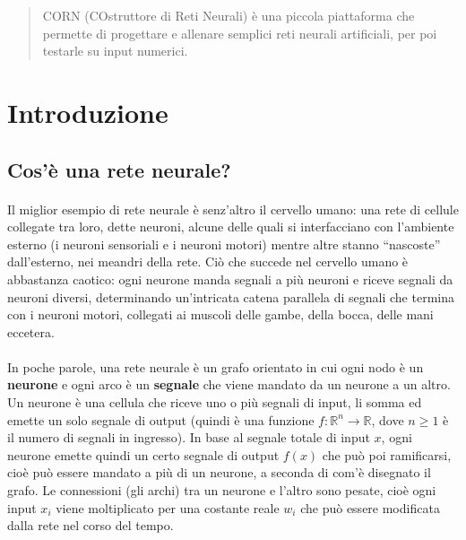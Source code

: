 \documentclass[12pt]{article}
\begin{document}
\maketitle




\begin{abstract}
\textsc{CORN} (COstruttore di Reti Neurali) è una piccola piattaforma che permette di progettare e allenare semplici reti neurali artificiali, per poi  testarle su input numerici.
\end{abstract}




\section{Introduzione}

\subsection{Cos'è una rete neurale?}

\paragraph{}
Il miglior esempio di rete neurale è senz'altro il cervello umano: una rete di cellule collegate tra loro, dette neuroni, alcune delle quali si interfacciano con l'ambiente esterno (i neuroni sensoriali e i neuroni motori) mentre altre stanno “nascoste” dall'esterno, nei meandri della rete. Ciò che succede nel cervello umano è abbastanza caotico: ogni neurone manda segnali a più neuroni e riceve segnali da neuroni diversi, determinando un'intricata catena parallela di segnali che termina con i neuroni motori, collegati ai muscoli delle gambe, della bocca, delle mani eccetera.

\paragraph{}
In poche parole, una rete neurale è un grafo orientato in cui ogni nodo è un \textbf{neurone} e ogni arco è un \textbf{segnale} che viene mandato da un neurone a un altro. Un neurone è una cellula che riceve uno o più segnali di input, li somma ed emette un solo segnale di output (quindi è una funzione $f : \mathbb{R}^n \rightarrow \mathbb{R}$, dove $n \ge 1$ è il numero di segnali in ingresso). In base al segnale totale di input $x$, ogni neurone emette quindi un certo segnale di output $f(x)$ che può poi ramificarsi, cioè può essere mandato a più di un neurone, a seconda di com'è disegnato il grafo. Le connessioni (gli archi) tra un neurone e l'altro sono pesate, cioè ogni input $x_i$ viene moltiplicato per una costante reale $w_i$ che può essere modificata dalla rete nel corso del tempo.
\end{document}
